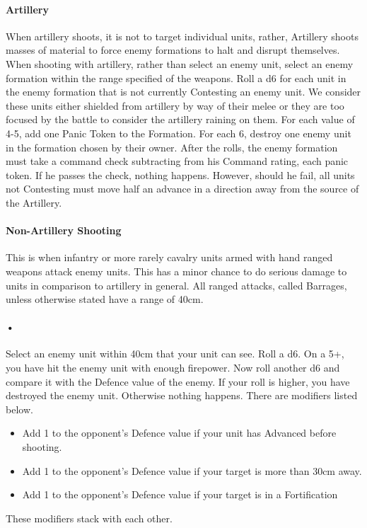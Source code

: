 \documentclass[12pt]{article}
\begin{document}
\paragraph{Artillery}
When artillery shoots, it is not to target individual units, rather, Artillery shoots masses of material to force enemy formations to halt and disrupt themselves. When shooting with artillery, rather than select an enemy unit, select an enemy formation within the range specified of the weapons. Roll a d6 for each unit in the enemy formation that is not currently Contesting an enemy unit. We consider these units either shielded from artillery by way of their melee or they are too focused by the battle to consider the artillery raining on them. For each value of 4-5, add one Panic Token to the Formation. For each 6, destroy one enemy unit in the formation chosen by their owner. After the rolls, the enemy formation must take a command check subtracting from his Command rating, each panic token. If he passes the check, nothing happens. However, should he fail, all units not Contesting must move half an advance in a direction away from the source of the Artillery. 

\paragraph{Non-Artillery Shooting}
This is when infantry or more rarely cavalry units armed with hand ranged weapons attack enemy units. This has a minor chance to do serious damage to units in comparison to artillery in general. All ranged attacks, called Barrages, unless otherwise stated have a range of 40cm.
\paragraph{•}
Select an enemy unit within 40cm that your unit can see. Roll a d6. On a 5+, you have hit the enemy unit with enough firepower. Now roll another d6 and compare it with the Defence value of the enemy. If your roll is higher, you have destroyed the enemy unit. Otherwise nothing happens. There are modifiers listed below.
\begin{itemize}
\item Add 1 to the opponent's Defence value if your unit has Advanced before shooting.
\item Add 1 to the opponent's Defence value if your target is more than 30cm away.
\item Add 1 to the opponent's Defence value if your target is in a Fortification
\end{itemize}
These modifiers stack with each other.
\end{document}
